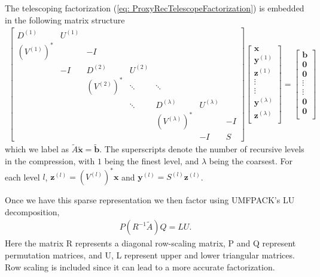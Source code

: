 \documentclass{sfuthesis}
\begin{document}
The telescoping factorization (\ref{eq: ProxyRecTelescopeFactorization}) is embedded in the following matrix structure 
\begin{align*}
	\left[\begin{array}{ccccccc}
	D^{(1)} & U^{(1)} & & & & & \\
	{(V^{(1)})}^* & & -I & & & &   \\
 	&-I & D^{(2)}&U^{(2)} & & & \\
  	& & {(V^{(2)})}^*& \ddots & \ddots & & \\
  	&  &  & \ddots & D^{(\lambda)} & U^{(\lambda)} & \\
  	&  &  &   & {(V^{(\lambda)})}^*& & -I \\
  	&  &  &   &  &-I & S
 	 \end{array}\right]
	\left[ \begin{array}{c}
	\mathbf{x}\\
	\mathbf{y}^{(1)} \\
	\mathbf{z}^{(1)} \\
	\vdots \\
	\vdots \\
	\mathbf{y}^{(\lambda)} \\
	\mathbf{z}^{(\lambda)} \\
	\end{array} \right]
	=\left[ \begin{array}{c}
	\mathbf{b}\\
	\mathbf{0} \\
	\mathbf{0} \\
	\vdots \\
	\vdots \\
	\mathbf{0} \\
	\mathbf{0} \\
	\end{array} \right]
\end{align*} 
which we label as $\widetilde{A} \widetilde{\mathbf{x}}=\widetilde{\mathbf{b}}$. The superscripts denote the number of recursive levels in the compression, with $1$ being the finest level, and $\lambda$ being the coarsest. For each level $l$, $\mathbf{z}^{(l)}={(V^{(l)})}^* \mathbf{x}$ and $\mathbf{y}^{(l)}=S^{(l)}\mathbf{z}^{(l)}$. 

Once we have this sparse representation we then factor using UMFPACK's LU decomposition, 
\begin{align*}
	P(R^{-1}\widetilde{A})Q=LU.
\end{align*}
Here the matrix R represents a diagonal row-scaling matrix, P and Q represent permutation matrices, and U, L represent upper and lower triangular matrices. Row scaling is included since it can lead to a more accurate factorization. 
\end{document}

